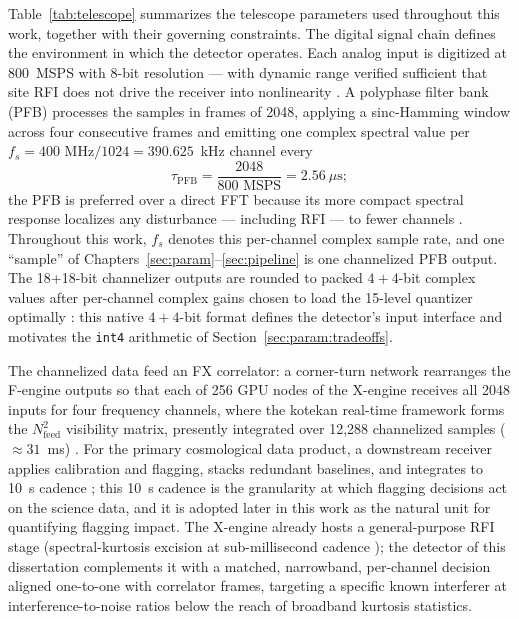 Table~\ref{tab:telescope} summarizes the telescope parameters used throughout this work, together with their governing constraints. The digital signal chain defines the environment in which the detector operates. Each analog input is digitized at 800~MSPS with 8-bit resolution --- with dynamic range verified sufficient that site RFI does not drive the receiver into nonlinearity \cite{amiri2022chime}. A polyphase filter bank (PFB) processes the samples in frames of 2048, applying a sinc-Hamming window across four consecutive frames and emitting one complex spectral value per $f_s = 400\text{ MHz}/1024 = 390.625$~kHz channel every
\begin{equation}
\tau_{\text{PFB}} = \frac{2048}{800\text{ MSPS}} = 2.56~\mu\text{s};
\end{equation}
the PFB is preferred over a direct FFT because its more compact spectral response localizes any disturbance --- including RFI --- to fewer channels \cite{amiri2022chime}. Throughout this work, $f_s$ denotes this per-channel complex sample rate, and one ``sample'' of Chapters~\ref{sec:param}--\ref{sec:pipeline} is one channelized PFB output. The 18{+}18-bit channelizer outputs are rounded to packed $4{+}4$-bit complex values after per-channel complex gains chosen to load the 15-level quantizer optimally \cite{amiri2022chime,menaparra2018}: this native $4{+}4$-bit format defines the detector's input interface and motivates the \texttt{int4} arithmetic of Section~\ref{sec:param:tradeoffs}.

The channelized data feed an FX correlator: a corner-turn network rearranges the F-engine outputs so that each of 256 GPU nodes of the X-engine receives all 2048 inputs for four frequency channels, where the kotekan real-time framework \cite{kotekan} forms the $N_{\text{feed}}^2$ visibility matrix, presently integrated over 12{,}288 channelized samples (${\approx}31$~ms) \cite{amiri2022chime}. For the primary cosmological data product, a downstream receiver applies calibration and flagging, stacks redundant baselines, and integrates to 10~s cadence \cite{amiri2022chime} ; this 10~s cadence is the granularity at which flagging decisions act on the science data, and it is adopted later in this work as the natural unit for quantifying flagging impact. The X-engine already hosts a general-purpose RFI stage (spectral-kurtosis excision at sub-millisecond cadence \cite{amiri2022chime}); the detector of this dissertation complements it with a matched, narrowband, per-channel decision aligned one-to-one with correlator frames, targeting a specific known interferer at interference-to-noise ratios below the reach of broadband kurtosis statistics.

